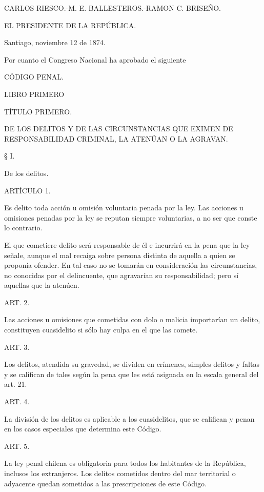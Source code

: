 CARLOS RIESCO.-M. E. BALLESTEROS.-RAMON C. BRISEÑO.


    EL PRESIDENTE DE LA REPÚBLICA.

    Santiago, noviembre 12 de 1874.

    Por cuanto el Congreso Nacional ha aprobado el siguiente

    CÓDIGO PENAL.

    LIBRO PRIMERO





    TÍTULO PRIMERO.

DE LOS DELITOS Y DE LAS CIRCUNSTANCIAS QUE EXIMEN DE RESPONSABILIDAD CRIMINAL, LA ATENÚAN O LA AGRAVAN.





    § I.

    De los delitos.



    ARTÍCULO 1.

    Es delito toda acción u omisión voluntaria penada por la ley.
    Las acciones u omisiones penadas por la ley se reputan siempre voluntarias, a no ser que conste lo contrario.

    El que cometiere delito será responsable de él e incurrirá en la pena que la ley señale, aunque el mal recaiga sobre persona distinta de aquella a quien se proponía ofender. En tal caso no se tomarán en consideración las circunstancias, no conocidas por el delincuente, que agravarían su responsabilidad; pero sí aquellas que la atenúen.


    ART. 2.

    Las acciones u omisiones que cometidas con dolo o malicia importarían un delito, constituyen cuasidelito si sólo hay culpa en el que las comete.



    ART. 3.

    Los delitos, atendida su gravedad, se dividen en crímenes, simples delitos y faltas y se califican de tales según la pena que les está asignada en la escala general del art. 21.


    ART. 4.

    La división de los delitos es aplicable a los cuasidelitos, que se califican y penan en los casos especiales que determina este Código.


    ART. 5.

    La ley penal chilena es obligatoria para todos los habitantes de la República, inclusos los extranjeros. Los delitos cometidos dentro del mar territorial o adyacente quedan sometidos a las prescripciones de este Código.



